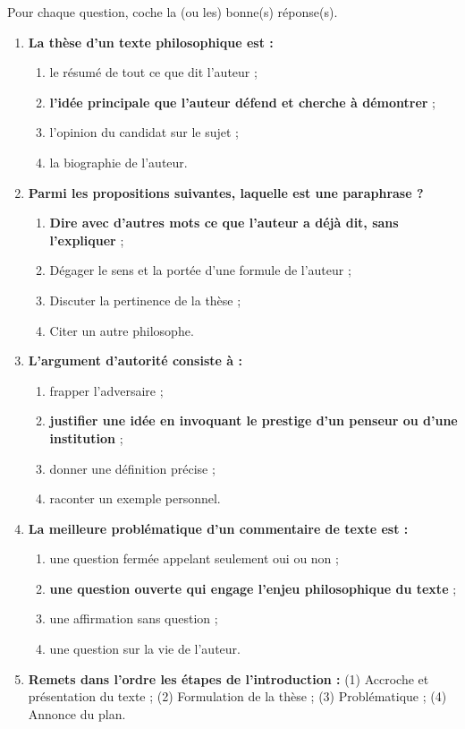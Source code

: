 \documentclass[11pt]{article}
\newcommand{\cle}[1]{{\popxbold\color{popdark}#1}}
\begin{document}
\begin{exercice}
Pour chaque question, coche la (ou les) bonne(s) réponse(s).
\begin{enumerate}
\item \textbf{La \cle{thèse} d'un texte philosophique est :}
\begin{enumerate}
\item le résumé de tout ce que dit l'auteur ;
\item \textbf{l'idée principale que l'auteur défend et cherche à démontrer} ;
\item l'opinion du candidat sur le sujet ;
\item la biographie de l'auteur.
\end{enumerate}

\item \textbf{Parmi les propositions suivantes, laquelle est une \cle{paraphrase} ?}
\begin{enumerate}
\item \textbf{Dire avec d'autres mots ce que l'auteur a déjà dit, sans l'expliquer} ;
\item Dégager le sens et la portée d'une formule de l'auteur ;
\item Discuter la pertinence de la thèse ;
\item Citer un autre philosophe.
\end{enumerate}

\item \textbf{L'argument d'autorité consiste à :}
\begin{enumerate}
\item frapper l'adversaire ;
\item \textbf{justifier une idée en invoquant le prestige d'un penseur ou d'une institution} ;
\item donner une définition précise ;
\item raconter un exemple personnel.
\end{enumerate}

\item \textbf{La meilleure problématique d'un commentaire de texte est :}
\begin{enumerate}
\item une question fermée appelant seulement oui ou non ;
\item \textbf{une question ouverte qui engage l'enjeu philosophique du texte} ;
\item une affirmation sans question ;
\item une question sur la vie de l'auteur.
\end{enumerate}

\item \textbf{Remets dans l'ordre les étapes de l'introduction :} (1) Accroche et présentation du texte ; (2) Formulation de la thèse ; (3) Problématique ; (4) Annonce du plan.
\end{enumerate}
\end{exercice}
\end{document}

